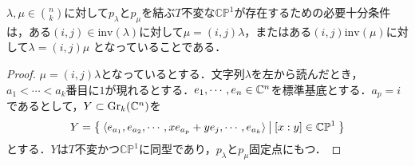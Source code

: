 \begin{prop}
  $\lambda,\mu\in\binom{n}{k}$に対して$p_\lambda$と$p_\mu$を結ぶ$T$不変な$\mathbb{CP}^1$が存在するための必要十分条件は，ある$(i, j)\in\text{inv}(\lambda)$に対して$\mu = (i, j)\lambda$，またはある$(i,j)\text{inv}(\mu)$に対して$\lambda = (i, j)\mu$
  となっていることである．
\end{prop}

\begin{proof}
  $\mu = (i,j)\lambda$となっているとする．文字列$\lambda$を左から読んだとき，$a_1<\cdots<a_k$番目に$1$が現れるとする．$e_1,\cdots,e_n\in\mathbb{C}^n$を標準基底とする．$a_p = i$であるとして，$Y\subset \text{Gr}_k(\mathbb{C}^n)$を
  \begin{equation}\label{1dim orbit}
  Y=\left\{\:\langle e_{a_1},e_{a_2},\cdots, xe_{a_p}+ye_j,\cdots,e_{a_k} \rangle\:\middle|\:[x:y]\in\mathbb{CP}^1\:\right\}
  \end{equation}
  とする．$Y$は$T$不変かつ$\mathbb{CP}^1$に同型であり，$p_\lambda$と$p_\mu$固定点にもつ．


\end{proof}
